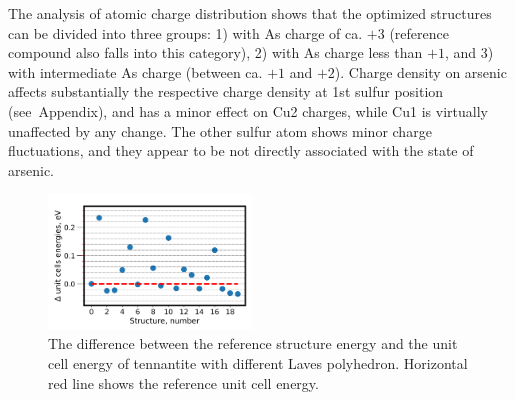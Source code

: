 \documentclass[preprint,review,12pt]{elsarticle}
\begin{document}
\begin{table}
\caption{\label{tab:energy}%
The difference between the reference structure energy, and the unit cell energy of tennantite with different Laves polyhedron.
}
\centering
{}
\end{table}

The analysis  of atomic charge distribution shows that the optimized structures can be divided into three groups: 1) with As charge of ca. $+3$ (reference compound also falls into this category), 2) with As charge less than $+1$, and 3) with intermediate As charge (between ca. $+1$ and $+2$).
Charge density on arsenic affects substantially the respective charge density at 1st sulfur position (see~Appendix), and has a minor effect on Cu2 charges, while Cu1 is virtually unaffected by any change.
The other sulfur atom shows minor charge fluctuations, and they appear to be not directly associated with the state of arsenic.

\begin{figure}
\centering
 \includegraphics[width=0.48\textwidth]{energy_structure_rescale_ri}
 \caption{\label{fig:energy_structure_rescale} The difference between the reference structure energy and the unit cell energy of tennantite with different Laves polyhedron. Horizontal red line shows the reference unit cell energy. }
\end{figure}
\end{document}
